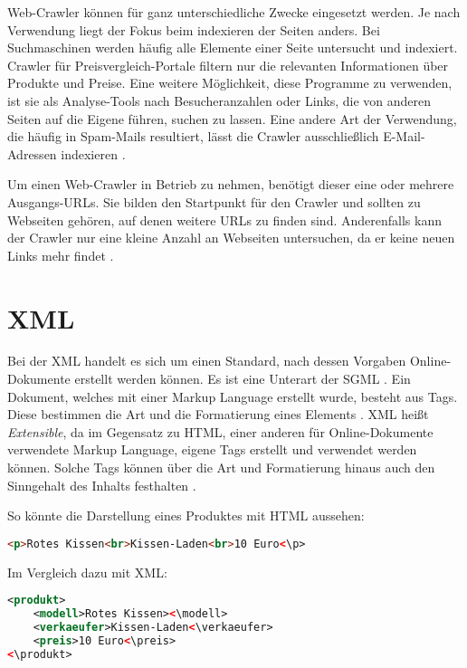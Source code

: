 Web-Crawler können für ganz unterschiedliche Zwecke eingesetzt werden. Je nach Verwendung liegt der Fokus beim indexieren der Seiten anders. Bei Suchmaschinen werden häufig alle Elemente einer Seite untersucht und indexiert. Crawler für Preisvergleich-Portale filtern nur die relevanten Informationen über Produkte und Preise. Eine weitere Möglichkeit, diese Programme zu verwenden, ist sie als Analyse-Tools nach Besucheranzahlen oder Links, die von anderen Seiten auf die Eigene führen, suchen zu lassen. Eine andere Art der Verwendung, die häufig in Spam-Mails resultiert, lässt die Crawler ausschließlich E-Mail-Adressen indexieren \cite{ryte}.

Um einen Web-Crawler in Betrieb zu nehmen, benötigt dieser eine oder mehrere Ausgangs-URLs. Sie bilden den Startpunkt für den Crawler und sollten zu Webseiten gehören, auf denen weitere URLs zu finden sind. Anderenfalls kann der Crawler nur eine kleine Anzahl an Webseiten untersuchen, da er keine neuen Links mehr findet \cite{how}. 


\newpage

\section{XML}
\large
Bei der \ac{XML} handelt es sich um einen Standard, nach dessen Vorgaben Online-Dokumente erstellt werden können. Es ist eine Unterart der \ac{SGML} \cite{xmldef}. Ein Dokument, welches mit einer Markup Language erstellt wurde, besteht aus Tags. Diese bestimmen die Art und die Formatierung eines Elements \cite{markup}. \ac{XML} heißt \textit{Extensible}, da im Gegensatz zu \ac{HTML}, einer anderen für Online-Dokumente verwendete Markup Language, eigene Tags erstellt und verwendet werden können. Solche Tags können über die Art und Formatierung hinaus auch den Sinngehalt des Inhalts festhalten \cite{xmldef}.

So könnte die Darstellung eines Produktes mit \acs{HTML} aussehen: \\
\begin{lstlisting}[title=Beispiel-Code HTML, language=HTML]
<p>Rotes Kissen<br>Kissen-Laden<br>10 Euro<\p>
\end{lstlisting}

Im Vergleich dazu mit \ac{XML}: \\

\begin{lstlisting}[title=Beispiel-Code XML, language=XML, morekeywords={produkt, modell, verkaeufer, preis}]
<produkt>
	<modell>Rotes Kissen><\modell>
	<verkaeufer>Kissen-Laden<\verkaeufer>
	<preis>10 Euro<\preis>
<\produkt>
\end{lstlisting}

